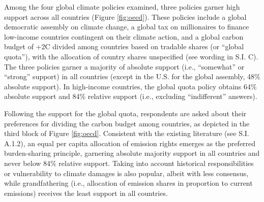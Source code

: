 Among the four global climate policies examined, three policies garner high support across all countries (Figure \ref{fig:oecd}). These policies include a global democratic assembly on climate change, a global tax on millionaires to finance low-income countries contingent on their climate action, and a global carbon budget of +2\textdegree{}C divided among countries based on tradable shares (or ``global quota''), with the allocation of country shares unspecified (see wording in S.I. C). %
The three policies garner a majority of absolute support (i.e., ``somewhat'' or ``strong'' support) in all countries (except in the U.S. for the global assembly, 48\% absolute support). In high-income countries, the global quota policy obtains 64\% absolute support and 84\% relative support (i.e., excluding ``indifferent'' answers). %

Following the support for the global quota, respondents are asked about their preferences for dividing the carbon budget among countries, as depicted in the third block of Figure \ref{fig:oecd}. Consistent with the existing literature (see S.I. A.1.2), %
an equal per capita allocation of emission rights emerges as the preferred burden-sharing principle, garnering absolute majority support in all countries and never below 84\% relative support. Taking into account historical responsibilities or vulnerability to climate damages is also popular, albeit with less consensus, while grandfathering (i.e., allocation of emission shares in proportion to current emissions) receives the least support in all countries.


